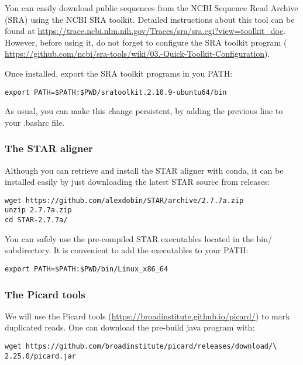 You can easily download public sequences from the NCBI Sequence Read Archive (SRA) using the NCBI SRA toolkit. Detailed instructions about this tool can be found at \href{https://trace.ncbi.nlm.nih.gov/Traces/sra/sra.cgi?view=toolkit_doc}{https://trace.ncbi.nlm.nih.gov/Traces/sra/sra.cgi?view=toolkit\_doc}. However, before using it, do not forget to configure the SRA toolkit program ( \href{https://github.com/ncbi/sra-tools/wiki/03.-Quick-Toolkit-Configuration}{https://github.com/ncbi/sra-tools/wiki/03.-Quick-Toolkit-Configuration}).


Once installed, export the SRA toolkit programs in you PATH:

\begin{verbatim}
export PATH=$PATH:$PWD/sratoolkit.2.10.9-ubuntu64/bin
\end{verbatim}

As usual, you can make this change persistent, by adding the previous line to your .bashrc file.


\subsubsection{The STAR aligner}

Although you can retrieve and install the STAR aligner with conda, it can be installed easily by just downloading the latest STAR source from releases:

\begin{verbatim} 
wget https://github.com/alexdobin/STAR/archive/2.7.7a.zip
unzip 2.7.7a.zip
cd STAR-2.7.7a/
\end{verbatim}

You can safely use the pre-compiled STAR executables located in the bin/ subdirectory. It is convenient to add the executables to your PATH:

\begin{verbatim}
export PATH=$PATH:$PWD/bin/Linux_x86_64
\end{verbatim}



\subsubsection{The Picard tools}

We will use the Picard tools (\href{https://broadinstitute.github.io/picard/}{https://broadinstitute.github.io/picard/}) to mark duplicated reads. One can download the pre-build java program with:

\begin{verbatim}
wget https://github.com/broadinstitute/picard/releases/download/\
2.25.0/picard.jar
\end{verbatim}


